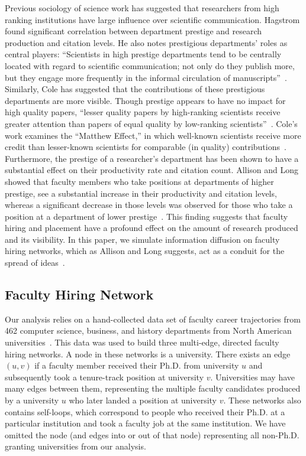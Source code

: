 \documentclass[%
 reprint,
 amsmath,amssymb,
 aps,
]{revtex4-1}
\begin{document}
Previous sociology of science work has suggested that researchers from high ranking institutions have large influence over scientific communication. Hagstrom found significant correlation between department prestige and research production and citation levels. He also notes prestigious departments' roles as central players: ``Scientists in high prestige departments tend to be centrally located with regard to scientific communication; not only do they publish more, but they engage more frequently in the informal circulation of manuscripts''~\cite{hagstrom:prestige}. Similarly, Cole has suggested that the contributions of these prestigious departments are more visible. Though prestige appears to have no impact for high quality papers, ``lesser quality papers by high-ranking scientists receive greater attention than papers of equal quality by low-ranking scientists''~\cite{cole:citation-prestige}. Cole's work examines the ``Matthew Effect,'' in which well-known scientists receive more credit than lesser-known scientists for comparable (in quality) contributions~\cite{merton:matthew-effect}. Furthermore, the prestige of a researcher's department has been shown to have a substantial effect on their productivity rate and citation count. Allison and Long showed that faculty members who take positions at departments of higher prestige, see a substantial increase in their productivity and citation levels, whereas a significant decrease in those levels was observed for those who take a position at a department of lower prestige~\cite{allison:department-effects}. This finding suggests that faculty hiring and placement have a profound effect on the amount of research produced and its visibility. In this paper, we simulate information diffusion on faculty hiring networks, which as Allison and Long suggests, act as a conduit for the spread of ideas~\cite{allison:department-effects}.

\subsection{\label{sec:level2}Faculty Hiring Network}

Our analysis relies on a hand-collected data set of faculty career trajectories from 462 computer science, business, and history departments from North American universities~\cite{clauset:hiring, clauset:hiringweb}. This data was used to build three multi-edge, directed faculty hiring networks. A node in these networks is a university. There exists an edge $(u, v)$ if a faculty member received their Ph.D. from university $u$ and subsequently took a tenure-track position at university $v$. Universities may have many edges between them, representing the multiple faculty candidates produced by a university $u$ who later landed a position at university $v$. These networks also contains self-loops, which correspond to people who received their Ph.D. at a particular institution and took a faculty job at the same institution. We have omitted the node (and edges into or out of that node) representing all non-Ph.D. granting universities from our analysis.
\end{document}
